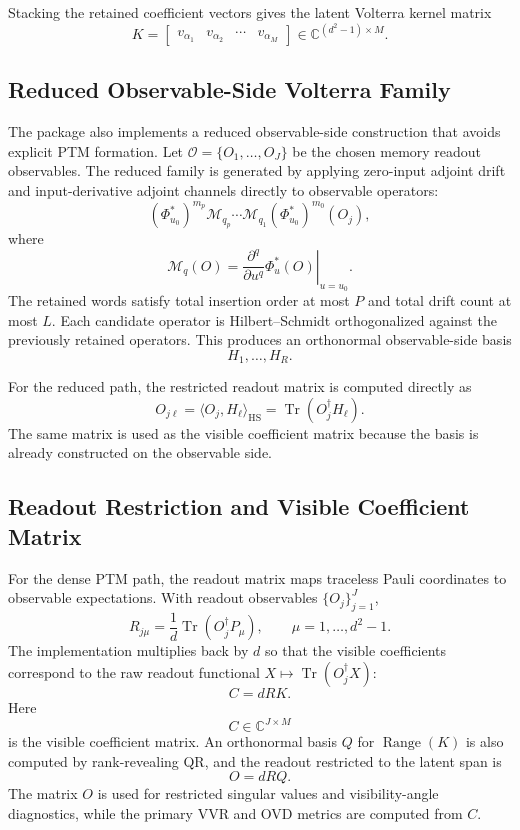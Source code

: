 \documentclass[11pt]{article}
\newcommand{\C}{\mathbb{C}}
\newcommand{\Tr}{\operatorname{Tr}}
\newcommand{\Range}{\operatorname{Range}}
\begin{document}
Stacking the retained coefficient vectors gives the latent Volterra kernel
matrix
\[
    K =
    \begin{bmatrix}
        v_{\alpha_1} & v_{\alpha_2} & \cdots & v_{\alpha_M}
    \end{bmatrix}
    \in \C^{(d^2-1)\times M}.
\]

\subsection{Reduced Observable-Side Volterra Family}

The package also implements a reduced observable-side construction that avoids
explicit PTM formation.  Let $\mathcal{O}=\{O_1,\ldots,O_J\}$ be the chosen
memory readout observables.  The reduced family is generated by applying
zero-input adjoint drift and input-derivative adjoint channels directly to
observable operators:
\[
    (\Phi_{u_0}^*)^{m_p}
    \mathcal{M}_{q_p}
    \cdots
    \mathcal{M}_{q_1}
    (\Phi_{u_0}^*)^{m_0}(O_j),
\]
where
\[
    \mathcal{M}_q(O)
    =
    \left.\frac{\partial^q}{\partial u^q}\Phi_u^*(O)\right|_{u=u_0}.
\]
The retained words satisfy total insertion order at most $P$ and total drift
count at most $L$.  Each candidate operator is Hilbert--Schmidt orthogonalized
against the previously retained operators.  This produces an orthonormal
observable-side basis
\[
    H_1,\ldots,H_R.
\]

For the reduced path, the restricted readout matrix is computed directly as
\[
    O_{j\ell} = \langle O_j, H_\ell\rangle_{\mathrm{HS}}
    =
    \Tr(O_j^\dagger H_\ell).
\]
The same matrix is used as the visible coefficient matrix because the basis is
already constructed on the observable side.

\subsection{Readout Restriction and Visible Coefficient Matrix}

For the dense PTM path, the readout matrix maps traceless Pauli coordinates to
observable expectations.  With readout observables $\{O_j\}_{j=1}^{J}$,
\[
    R_{j\mu}
    =
    \frac{1}{d}\Tr(O_j^\dagger P_\mu),
    \qquad
    \mu = 1,\ldots,d^2-1.
\]
The implementation multiplies back by $d$ so that the visible coefficients
correspond to the raw readout functional $X\mapsto \Tr(O_j^\dagger X)$:
\[
    C = d R K.
\]
Here
\[
    C \in \C^{J\times M}
\]
is the visible coefficient matrix.  An orthonormal basis $Q$ for
$\Range(K)$ is also computed by rank-revealing QR, and the readout restricted
to the latent span is
\[
    O = d R Q.
\]
The matrix $O$ is used for restricted singular values and visibility-angle
diagnostics, while the primary VVR and OVD metrics are computed from $C$.
\end{document}
